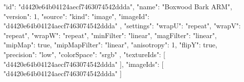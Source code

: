 {
  "id": "d4420e64b04124aecf7463074542ddda",
  "name": "Boxwood Bark ARM",
  "version": 1,
  "source": {
    "kind": "image",
    "imageId": "d4420e64b04124aecf7463074542ddda"
  },
  "settings": {
    "wrapU": "repeat",
    "wrapV": "repeat",
    "wrapW": "repeat",
    "minFilter": "linear",
    "magFilter": "linear",
    "mipMap": true,
    "mipMapFilter": "linear",
    "anisotropy": 1,
    "flipY": true,
    "precision": "low",
    "colorSpace": "srgb"
  },
  "textureIds": [
    "d4420e64b04124aecf7463074542ddda"
  ],
  "imageIds": [
    "d4420e64b04124aecf7463074542ddda"
  ]
}
